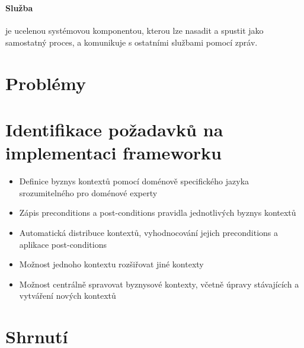 ~\cite{perrey2003service}
~\cite{cerny2017disambiguation}

\paragraph{Služba} je ucelenou systémovou komponentou,
kterou lze nasadit a spustit jako samostatný proces, a
komunikuje s ostatními službami pomocí zpráv.

\section{Problémy}

\section{Identifikace požadavků na implementaci frameworku}

\begin{itemize}
    \item{Definice byznys kontextů pomocí doménově specifického jazyka srozumitelného pro doménové experty}
    \item{Zápis preconditions a post-conditions pravidla jednotlivých byznys kontextů}
    \item{Automatická distribuce kontextů, vyhodnocování jejich preconditions a aplikace post-conditions}
    \item{Možnost jednoho kontextu rozšiřovat jiné kontexty}
    \item{Možnost centrálně spravovat byznysové kontexty, včetně úpravy stávajících a vytváření nových kontextů}
\end{itemize}

\section{Shrnutí}
